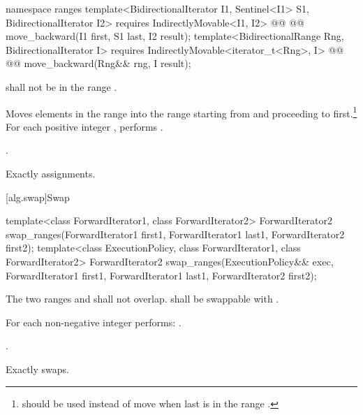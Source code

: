 \begin{addedblock}
%
\begin{itemdecl}
namespace ranges {
  template<BidirectionalIterator I1, Sentinel<I1> S1, BidirectionalIterator I2>
    requires IndirectlyMovable<I1, I2>
    @@
    @@
      move_backward(I1 first, S1 last, I2 result);
  template<BidirectionalRange Rng, BidirectionalIterator I>
    requires IndirectlyMovable<iterator_t<Rng>, I>
    @@
    @@
      move_backward(Rng&& rng, I result);
}
\end{itemdecl}

\begin{itemdescr}
\pnum
\requires
{}
shall not be in the range
.

\pnum
\effects
Moves elements in the range 
into the
range 
starting from
and proceeding to first.\footnote{
should be used instead of move when last
is in
the range
.}
For each positive integer
,
performs
.

\pnum
\returns
{}.

\pnum
\complexity
Exactly
assignments.
\end{itemdescr}
\end{addedblock}

[alg.swap]{Swap}

%
\begin{itemdecl}
template<class ForwardIterator1, class ForwardIterator2>
  ForwardIterator2
    swap_ranges(ForwardIterator1 first1, ForwardIterator1 last1,
                ForwardIterator2 first2);
template<class ExecutionPolicy, class ForwardIterator1, class ForwardIterator2>
  ForwardIterator2
    swap_ranges(ExecutionPolicy&& exec,
                ForwardIterator1 first1, ForwardIterator1 last1,
                ForwardIterator2 first2);
\end{itemdecl}

\begin{itemdescr}
\pnum
\requires
The two ranges 
and
shall not overlap.
 shall be swappable with
.

\pnum
\effects
For each non-negative integer
performs:
.

\pnum
\returns
{}.

\pnum
\complexity
Exactly
swaps.
\end{itemdescr}

